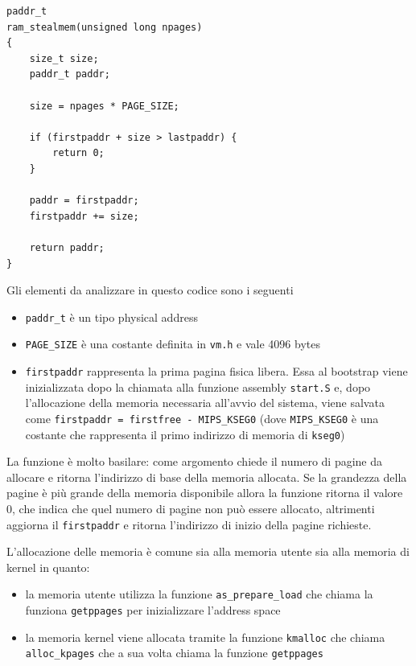 \begin{lstlisting}[caption={\lstinline{ram_stealmem} in \lstinline{ram.c}}]
paddr_t
ram_stealmem(unsigned long npages)
{
	size_t size;
	paddr_t paddr;

	size = npages * PAGE_SIZE;

	if (firstpaddr + size > lastpaddr) {
		return 0;
	}

	paddr = firstpaddr;
	firstpaddr += size;

	return paddr;
}
\end{lstlisting}
Gli elementi da analizzare in questo codice sono i seguenti
\begin{itemize}
    \item \lstinline{paddr_t} è un tipo physical address
    \item \lstinline{PAGE_SIZE} è una costante definita in \lstinline{vm.h} e vale 4096 bytes
    \item \lstinline{firstpaddr} rappresenta la prima pagina fisica libera. Essa al bootstrap viene inizializzata dopo la chiamata alla funzione assembly \lstinline{start.S} e, dopo l'allocazione della memoria necessaria all'avvio del sistema, viene salvata come \lstinline{firstpaddr = firstfree - MIPS_KSEG0} (dove \lstinline{MIPS_KSEG0} è una costante che rappresenta il primo indirizzo di memoria di \lstinline{kseg0})
\end{itemize}
La funzione è molto basilare: come argomento chiede il numero di pagine da allocare e ritorna l'indirizzo di base della memoria allocata. Se la grandezza della pagine è più grande della memoria disponibile allora la funzione ritorna il valore 0, che indica che quel numero di pagine non può essere allocato, altrimenti aggiorna il \lstinline{firstpaddr} e ritorna l'indirizzo di inizio della pagine richieste.

L'allocazione delle memoria è comune sia alla memoria utente sia alla memoria di kernel in quanto:
\begin{itemize}
    \item la memoria utente utilizza la funzione \lstinline{as_prepare_load} che chiama la funziona \lstinline{getppages} per inizializzare l'address space
    \item la memoria kernel viene allocata tramite la funzione \lstinline{kmalloc} che chiama \lstinline{alloc_kpages} che a sua volta chiama la funzione \lstinline{getppages}
\end{itemize}
